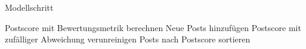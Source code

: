 
\begin{algorithm}
	\caption{Modellschritt}
		\label{alg:modelstep}
	\begin{algorithmic}
			\State Postscore mit Bewertungsmetrik berechnen
		\EndFor
		\State Neue Posts hinzufügen
				\State Postscore mit zufälliger Abweichung verunreinigen
			\EndFor
		\EndIf
		\State Posts nach Postscore sortieren
	\end{algorithmic}
\end{algorithm}





\cleardoublepage
